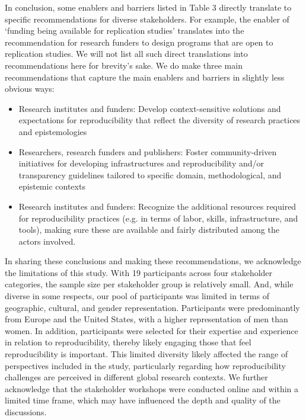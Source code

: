 \documentclass[authordate, meta]{jote-new-article}
\begin{document}
	In conclusion, some enablers and barriers listed in Table 3 directly translate to specific recommendations for diverse stakeholders. For example, the enabler of ‘funding being available for replication studies' translates into the recommendation for research funders to design programs that are open to replication studies. We will not list all such direct translations into recommendations here for brevity's sake. We do make three main recommendations that capture the main enablers and barriers in slightly less obvious ways:

	\begin{itemize}


		\item Research institutes and funders: Develop context-sensitive solutions and expectations for reproducibility that reflect the diversity of research practices and epistemologies


		\item Researchers, research funders and publishers: Foster community-driven initiatives for developing infrastructures and reproducibility and/or transparency guidelines tailored to specific domain, methodological, and epistemic contexts



		\item
		Research institutes and funders: Recognize the additional resources required for reproducibility practices (e.g. in terms of labor, skills, infrastructure, and tools), making sure these are available and fairly distributed among the actors involved.


	\end{itemize}

	In sharing these conclusions and making these recommendations, we acknowledge the limitations of this study. With 19 participants across four stakeholder categories, the sample size per stakeholder group is relatively small. And, while diverse in some respects, our pool of participants was limited in terms of geographic, cultural, and gender representation. Participants were predominantly from Europe and the United States, with a higher representation of men than women. In addition, participants were selected for their expertise and experience in relation to reproducibility, thereby likely engaging those that feel reproducibility is important. This limited diversity likely affected the range of perspectives included in the study, particularly regarding how reproducibility challenges are perceived in different global research contexts. We further acknowledge that the stakeholder workshops were conducted online and within a limited time frame, which may have influenced the depth and quality of the discussions.
\end{document}
